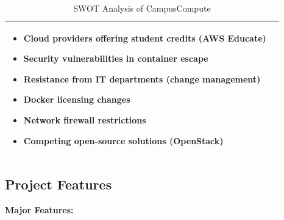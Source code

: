 \documentclass[12pt,a4paper]{article}
\begin{document}
\begin{table}[h]
\begin{tabular}{|p{7.5cm}|p{7.5cm}|}
\begin{itemize}[noitemsep,leftmargin=*]
    \item Cloud providers offering student credits (AWS Educate)
    \item Security vulnerabilities in container escape
    \item Resistance from IT departments (change management)
    \item Docker licensing changes
    \item Network firewall restrictions
    \item Competing open-source solutions (OpenStack)
\end{itemize} \\
\hline
\end{tabular}
\caption{SWOT Analysis of CampusCompute}
\end{table}

\subsection{Project Features}

\textbf{Major Features:}
\end{document}
